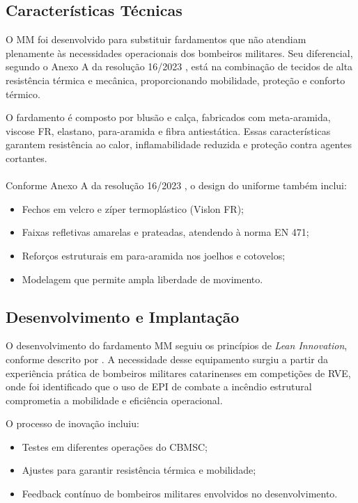 \subsection{Características Técnicas}

O \acrlong{MM} foi desenvolvido para substituir fardamentos que não atendiam plenamente às necessidades operacionais dos bombeiros militares. Seu diferencial, segundo o Anexo A da resolução 16/2023 \cite{res16}, está na combinação de tecidos de alta resistência térmica e mecânica, proporcionando mobilidade, proteção e conforto térmico.

O fardamento é composto por blusão e calça, fabricados com meta-aramida, viscose FR, elastano, para-aramida e fibra antiestática. Essas características garantem resistência ao calor, inflamabilidade reduzida e proteção contra agentes cortantes. 
\\\\
Conforme Anexo A da resolução 16/2023 \cite{res16}, o design do uniforme também inclui:
\begin{itemize}
    \item Fechos em velcro e zíper termoplástico (Vislon FR);
    \item Faixas refletivas amarelas e prateadas, atendendo à norma EN 471;
    \item Reforços estruturais em para-aramida nos joelhos e cotovelos;
    \item Modelagem que permite ampla liberdade de movimento.
\end{itemize}

\subsection{Desenvolvimento e Implantação}

O desenvolvimento do fardamento \acrlong{MM} seguiu os princípios de \textit{Lean Innovation}, conforme descrito por \textcite{Melina2023}. A necessidade desse equipamento surgiu a partir da experiência prática de bombeiros militares catarinenses em competições de \acrfull{RVE}, onde foi identificado que o uso de \acrshort{EPI} de combate a incêndio estrutural comprometia a mobilidade e eficiência operacional.

O processo de inovação incluiu:
\begin{itemize}
    \item Testes em diferentes operações do \acrshort{CBMSC};
    \item Ajustes para garantir resistência térmica e mobilidade;
    \item Feedback contínuo de bombeiros militares envolvidos no desenvolvimento.
\end{itemize}

